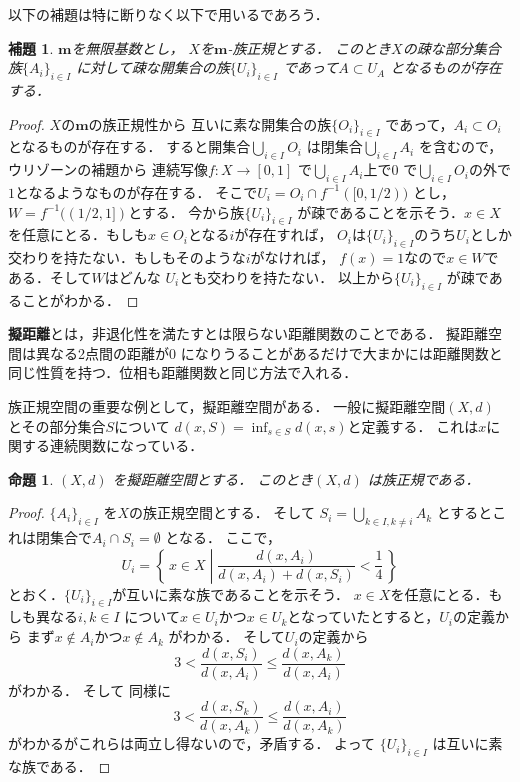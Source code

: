 \documentclass[leqno, a4paper, 12pt]{jsarticle}
\newtheorem{prop}[thm]{命題}
\newtheorem{lem}[thm]{補題}
\begin{document}
以下の補題は特に断りなく以下で用いるであろう．
\begin{lem}
$\mathbf{m}$を無限基数とし，
$X$を$\mathbf{m}$-族正規とする．
このとき$X$の疎な部分集合族$\{A_{i}\}_{i\in I}$
に対して疎な開集合の族$\{U_{i}\}_{i\in I}$
であって$A\subset U_{A}$
となるものが存在する．
\end{lem}
\begin{proof}
$X$の$\mathbf{m}$の族正規性から
互いに素な開集合の族$\{O_{i}\}_{i\in I}$
であって，$A_{i}\subset O_{i}$
となるものが存在する．
すると開集合$\bigcup_{i\in I}O_{i}$
は閉集合$\bigcup_{i\in I}A_{i}$
を含むので，ウリゾーンの補題から
連続写像$f\colon X\to [0, 1]$
で$\bigcup_{i\in I}A_{i}$上で$0$
で$\bigcup_{i\in I}O_{i}$の外で$1$となるようなものが存在する．
そこで$U_{i}=O_{i}\cap f^{-1}([0, 1/2))$
とし，$W=f^{-1}((1/2,  1])$とする．
今から族$\{U_{i}\}_{i\in I}$
が疎であることを示そう．$x\in X$
を任意にとる．もしも$x\in O_{i}$となる$i$が存在すれば，
$O_{i}$は$\{U_{i}\}_{i\in I}$のうち$U_{i}$としか交わりを持たない．もしもそのような$i$がなければ，
$f(x)=1$なので$x\in W$である．そして$W$はどんな
$U_{i}$とも交わりを持たない．
以上から$\{U_{i}\}_{i\in I}$
が疎であることがわかる．
\end{proof}




\textbf{擬距離}とは，非退化性を満たすとは限らない距離関数のことである．
擬距離空間は異なる2点間の距離が$0$
になりうることがあるだけで大まかには距離関数と同じ性質を持つ．位相も距離関数と同じ方法で入れる．

族正規空間の重要な例として，擬距離空間がある．
一般に擬距離空間$(X, d)$
とその部分集合$S$について
$d(x, S)=\inf_{s\in S}d(x, s)$と定義する．
これは$x$に関する連続関数になっている．
\begin{prop}\label{prop:aoao}
$(X, d)$
を擬距離空間とする．
このとき$(X, d)$
は族正規である．
\end{prop}
\begin{proof}
$\{A_{i}\}_{i\in I}$
を$X$の族正規空間とする．
そして
$S_{i}=\bigcup_{k\in I, k\neq i}A_{k}$
とするとこれは閉集合で$A_{i}\cap S_{i}=\emptyset$
となる．
ここで，
\[
U_{i}=\left\{\, x\in X\middle|\frac{d(x, A_{i})}{d(x, A_{i})+d(x, S_{i})}<\frac{1}{4}\, \right\}
\]
とおく．$\{U_{i}\}_{i\in I}$が互いに素な族であることを示そう．
$x\in X$を任意にとる．もしも異なる$i, k\in I$
について$x\in U_{i}$かつ$x\in U_{k}$となっていたとすると，$U_{i}$の定義から
まず$x\not \in A_{i}$かつ$x\not \in A_{k}$
がわかる．
そして$U_{i}$の定義から
\[
3<\frac{d(x, S_{i})}{d(x, A_{i})}\le \frac{d(x, A_{k})}{d(x, A_{i})}
\]
がわかる．
そして
同様に
\[
3<\frac{d(x, S_{k})}{d(x, A_{k})}\le \frac{d(x, A_{i})}{d(x, A_{k})}
\]
がわかるがこれらは両立し得ないので，矛盾する．
よって
$\{U_{i}\}_{i\in I}$
は互いに素な族である．
\end{proof}
\end{document}
